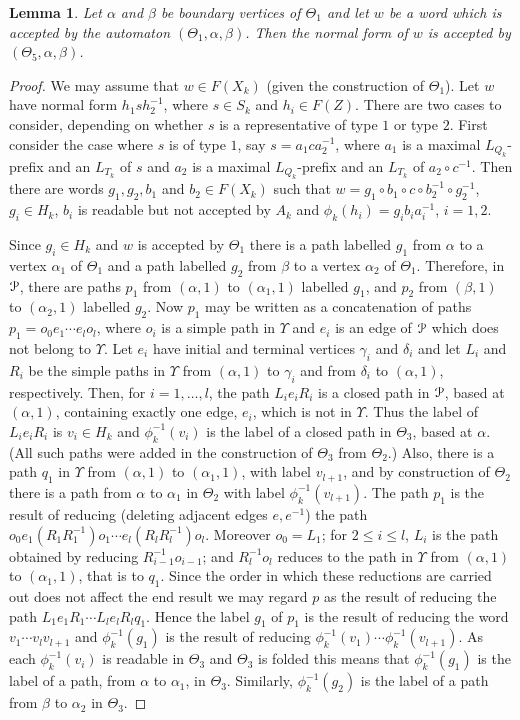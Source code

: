 \documentclass[a4paper,12pt]{article}
\renewcommand{\a}{\alpha }
\renewcommand{\b}{\beta }
\newcommand{\g}{\gamma }
\renewcommand{\d}{\delta }
\newcommand{\T}{\Theta }
\newcommand{\U}{\Upsilon }
\newcommand{\cP}{{\cal{P}}}
\newtheorem{lemma}[theorem]{Lemma}
\numberwithin{equation}{section}
\numberwithin{figure}{section}
\begin{document}
\begin{lemma}
Let $\a$ and $\b$ be boundary vertices of $\T_1$ and let $w$ be a word
 which is accepted by the automaton $(\T_1, \a, \b)$. Then the
normal form of $w$ is accepted by $(\T_5, \a, \b)$.
\end{lemma}
\begin{proof}
We may assume that $w\in F(X_k)$ (given the construction of $\T_1$).
Let $w$ have normal form $h_1s h_2^{-1}$, where $s\in S_k$ and $h_i\in F(Z)$.
There are two cases to consider, depending on whether $s$ is a
representative of type $1$ or type $2$.
 First consider the case where $s$ is of type $1$, say
 $s= a_1 c a_2^{-1}$, where
$a_1$ is a maximal $L_{Q_k}$-prefix and an $L_{T_k}$ of $s$ and 
 $a_2$  is a maximal $L_{Q_k}$-prefix and an $L_{T_k}$ of $a_2\circ c^{-1}$. 
 Then there are words
$g_1, g_2, b_1$ and $b_2\in F(X_k)$ such that
$w=g_1\circ b_1\circ c \circ b_2^{-1}\circ g_2^{-1}$,
$g_i\in H_k$, $b_i$ is readable but not accepted by  $A_k$ and
$\phi_k(h_i)=g_ib_ia_i^{-1}$, $i=1,2$.

Since $g_i\in H_k$ and $w$ is accepted by $\T_1$ there is a path
labelled $g_1$ from $\a$ to a vertex $\a_1$ of $\T_1$ and a path
labelled $g_2$ from $\b$ to a vertex $\a_2$ of $\T_1$. Therefore, in $\cP$,
there are paths $p_1$ from $(\a,1)$ to $(\a_1,1)$ labelled $g_1$, and
$p_2$
from $(\b,1)$ to $(\a_2,1)$ labelled $g_2$.
Now $p_1$ may
be written as a concatenation of paths $p_1=o_0e_1\cdots e_l o_{l}$,
where $o_i$ is a simple path in $\U$ and $e_i$ is an edge of $\cP$ which does
not belong to $\U$.  Let $e_i$ have initial and terminal vertices
$\g_i$ and $\d_i$ and let $L_i$ and $R_i$ be the simple paths in $\U$ from
$(\a,1)$ to $\g_i$ and from $\d_i$ to $(\a,1)$, respectively.
Then, for $i=1,\ldots ,l$,
the path $L_i e_i R_i$ is a closed path in $\cP$, based
at $(\a,1)$, containing exactly one edge, $e_i$, which is not in $\U$.
Thus the label of  $L_i e_i R_i$ is $v_i\in H_k$ and $\phi_k^{-1}(v_i)$ is the
label of a closed path in $\T_3$, based at  $\a$. (All such paths
were added in the construction of $\T_3$ from $\T_2$.)
Also, there is a path $q_1$ in $\U$ from $(\a,1)$ to $(\a_1,1)$, with
label $v_{l+1}$, and by construction of $\T_2$ there is a path from $\a$ to
$\a_1$ in $\T_2$ with label $\phi_k^{-1}(v_{l+1})$.
The path
$p_1$ is the result of reducing (deleting adjacent edges $e,e^{-1}$) the path
$o_0 e_1 (R_1 R_1^{-1}) o_1 \cdots e_{l}(R_l R_l^{-1}) o_{l}$.
Moreover $o_0=L_1$; for $2\le i\le l$,
$L_i$ is the path obtained by reducing $R_{i-1}^{-1}o_{i-1}$; and
$R_{l}^{-1}o_{l}$ reduces to the path in $\U$ from
$(\a,1)$ to $(\a_1,1)$, that is to $q_1$.
Since the
order in which these reductions are carried out does not affect the end
result we may regard $p$ as the result of reducing the path
$L_1 e_1 R_1 \cdots L_l e_l R_l q_1$. Hence the label $g_1$
of $p_1$ is the result of
reducing the word $v_1\cdots v_l v_{l+1}$ and $\phi_k^{-1}(g_1)$ is the result of
reducing $\phi_k^{-1}(v_1) \cdots \phi_k^{-1}(v_{l+1})$. As each $\phi_k^{-1}(v_i)$ is readable
in $\T_3$ and $\T_3$ is folded this means  that $\phi_k^{-1}(g_1)$ is the
label of a path, from $\a$ to   $\a_1$, in $\T_3$. Similarly,
$\phi_k^{-1}(g_2)$
is the label of a path from $\b$ to $\a_2$ in $\T_3$.


\end{proof}
\end{document}
